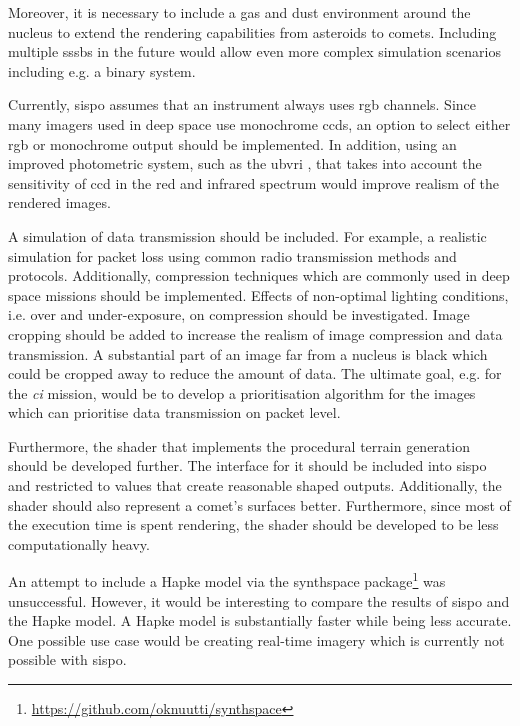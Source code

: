 Moreover, it is necessary to include a gas and dust environment around the nucleus to extend the rendering capabilities from asteroids to comets. Including multiple \glspl{sssb} in the future would allow even more complex simulation scenarios including e.g. a binary system.

Currently, \gls{sispo} assumes that an instrument always uses \gls{rgb} channels. Since many imagers used in deep space use monochrome \glspl{ccd}, an option to select either \gls{rgb} or monochrome output should be implemented. In addition, using an improved photometric system, such as the \gls{ubvri} \cite{Bessell1993PhotometricSystems}, that takes into account the sensitivity of \gls{ccd} in the red and infrared spectrum would improve realism of the rendered images.

A simulation of data transmission should be included. For example, a realistic simulation for packet loss using common radio transmission methods and protocols. Additionally, compression techniques which are commonly used in deep space missions should be implemented. Effects of non-optimal lighting conditions, i.e. over and under-exposure, on compression should be investigated. Image cropping should be added to increase the realism of image compression and data transmission. A substantial part of an image far from a nucleus is black which could be cropped away to reduce the amount of data. The ultimate goal, e.g. for the \textit{\gls{ci}} mission, would be to develop a prioritisation algorithm for the images which can prioritise data transmission on packet level.

Furthermore, the shader that implements the procedural terrain generation should be developed further. The interface for it should be included into \gls{sispo} and restricted to values that create reasonable shaped outputs. Additionally, the shader should also represent a comet's surfaces better. Furthermore, since most of the execution time is spent rendering, the shader should be developed to be less computationally heavy.

An attempt to include a Hapke model via the synthspace package\footnote{\url{https://github.com/oknuutti/synthspace}} was unsuccessful. However, it would be interesting to compare the results of \gls{sispo} and the Hapke model. A Hapke model is substantially faster while being less accurate. One possible use case would be creating real-time imagery which is currently not possible with \gls{sispo}.